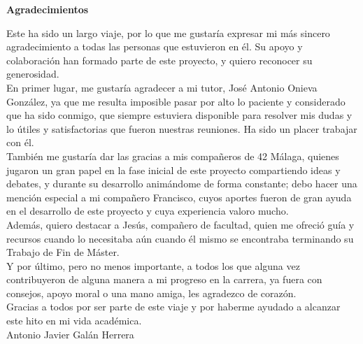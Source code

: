 \begin{center}

    \textbf{Agradecimientos} \\

\end{center}

Este ha sido un largo viaje, por lo que me gustaría expresar mi más sincero agradecimiento a todas las personas que estuvieron en él. Su apoyo y colaboración han formado parte de este proyecto, y quiero reconocer su generosidad.
\\

En primer lugar, me gustaría agradecer a mi tutor, José Antonio Onieva González, ya que me resulta imposible pasar por alto lo paciente y considerado que ha sido conmigo, que siempre estuviera disponible para resolver mis dudas y lo útiles y satisfactorias que fueron nuestras reuniones. Ha sido un placer trabajar con él.
\\

También me gustaría dar las gracias a mis compañeros de 42 Málaga, quienes jugaron un gran papel en la fase inicial de este proyecto compartiendo ideas y debates, y durante su desarrollo animándome de forma constante; debo hacer una mención especial a mi compañero Francisco, cuyos aportes fueron de gran ayuda en el desarrollo de este proyecto y cuya experiencia valoro mucho.
\\

Además, quiero destacar a Jesús, compañero de facultad, quien me ofreció guía y recursos cuando lo necesitaba aún cuando él mismo se encontraba terminando su Trabajo de Fin de Máster.
\\

Y por último, pero no menos importante, a todos los que alguna vez contribuyeron de alguna manera a mi progreso en la carrera, ya fuera con consejos, apoyo moral o una mano amiga, les agradezco de corazón.
\\

Gracias a todos por ser parte de este viaje y por haberme ayudado a alcanzar este hito en mi vida académica.
\\

Antonio Javier Galán Herrera
